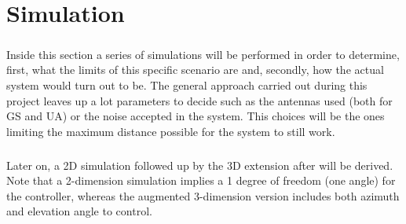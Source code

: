\chapter{Simulation}\label{ch:sim}

\paragraph{} Inside this section a series of simulations will be performed in order to determine, first, what the limits of this specific scenario are and, secondly, how the actual system would turn out to be.
The general approach carried out during this project leaves up a lot parameters to decide such as the antennas used (both for GS and UA) or the noise accepted in the system. This choices will be the ones limiting the maximum distance possible for the system to still work.

\paragraph{} Later on, a 2D simulation followed up by the 3D extension after will be derived. Note that a 2-dimension simulation implies a 1 degree of freedom (one angle) for the controller, whereas the augmented 3-dimension version includes both azimuth and elevation angle to control.


